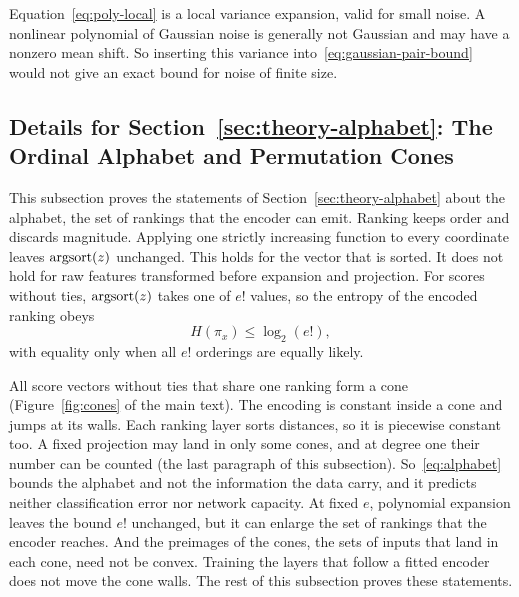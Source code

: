Equation~\eqref{eq:poly-local} is a local variance expansion, valid for small noise. A nonlinear polynomial of Gaussian noise is generally not Gaussian and may have a nonzero mean shift. So inserting this variance into~\eqref{eq:gaussian-pair-bound} would not give an exact bound for noise of finite size.

\subsection{Details for Section~\ref*{sec:theory-alphabet}: The Ordinal Alphabet and Permutation Cones}\label{supp:alphabet}

This subsection proves the statements of Section~\ref{sec:theory-alphabet} about the alphabet, the set of rankings that the encoder can emit. Ranking keeps order and discards magnitude. Applying one strictly increasing function to every coordinate leaves $\mathrm{argsort}(z)$ unchanged. This holds for the vector that is sorted. It does not hold for raw features transformed before expansion and projection. For scores without ties, $\mathrm{argsort}(z)$ takes one of $e!$ values, so the entropy of the encoded ranking obeys
\begin{equation}\label{eq:alphabet}
H(\pi_x)\le\log_2(e!),
\end{equation}
with equality only when all $e!$ orderings are equally likely.

All score vectors without ties that share one ranking form a cone (Figure~\ref{fig:cones} of the main text). The encoding is constant inside a cone and jumps at its walls. Each ranking layer sorts distances, so it is piecewise constant too. A fixed projection may land in only some cones, and at degree one their number can be counted (the last paragraph of this subsection). So~\eqref{eq:alphabet} bounds the alphabet and not the information the data carry, and it predicts neither classification error nor network capacity. At fixed $e$, polynomial expansion leaves the bound $e!$ unchanged, but it can enlarge the set of rankings that the encoder reaches. And the preimages of the cones, the sets of inputs that land in each cone, need not be convex. Training the layers that follow a fitted encoder does not move the cone walls. The rest of this subsection proves these statements.


